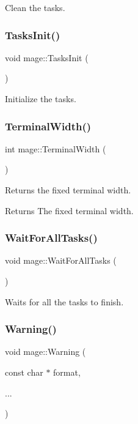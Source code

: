 Clean the tasks. \hypertarget{namespacemage_a8252f7acebefd3efe34a15cc51e4a7ac}{}\label{namespacemage_a8252f7acebefd3efe34a15cc51e4a7ac} 
\subsubsection{\texorpdfstring{Tasks\+Init()}{TasksInit()}}
{\footnotesize\ttfamily void mage\+::\+Tasks\+Init (\begin{DoxyParamCaption}{ }\end{DoxyParamCaption})}

Initialize the tasks. \hypertarget{namespacemage_a0c12a51bf3468b372932ffc1138a4ddc}{}\label{namespacemage_a0c12a51bf3468b372932ffc1138a4ddc} 
\subsubsection{\texorpdfstring{Terminal\+Width()}{TerminalWidth()}}
{\footnotesize\ttfamily int mage\+::\+Terminal\+Width (\begin{DoxyParamCaption}{ }\end{DoxyParamCaption})}

Returns the fixed terminal width.

\begin{DoxyReturn}{Returns}
The fixed terminal width. 
\end{DoxyReturn}
\hypertarget{namespacemage_a7da78c39175a029c92ed42d8fb9f30af}{}\label{namespacemage_a7da78c39175a029c92ed42d8fb9f30af} 
\subsubsection{\texorpdfstring{Wait\+For\+All\+Tasks()}{WaitForAllTasks()}}
{\footnotesize\ttfamily void mage\+::\+Wait\+For\+All\+Tasks (\begin{DoxyParamCaption}{ }\end{DoxyParamCaption})}

Waits for all the tasks to finish. \hypertarget{namespacemage_a0eccd8065c75d5f2bf86b48a5be3bfe5}{}\label{namespacemage_a0eccd8065c75d5f2bf86b48a5be3bfe5} 
\subsubsection{\texorpdfstring{Warning()}{Warning()}}
{\footnotesize\ttfamily void mage\+::\+Warning (\begin{DoxyParamCaption}\item[{const char $\ast$}]{format,  }\item[{}]{... }\end{DoxyParamCaption})}

